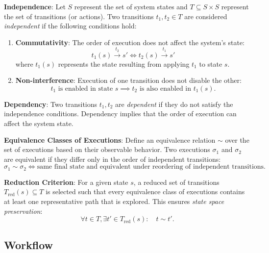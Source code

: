 \textbf{Independence}: Let \( S \) represent the set of system states and \( T \subseteq S \times S \) represent the set of transitions (or actions). Two transitions \( t_1, t_2 \in T \) are considered \textit{independent} if the following conditions hold:
\begin{enumerate}
    \item \textbf{Commutativity}: The order of execution does not affect the system's state:
    \[
    t_1(s) \xrightarrow{t_2} s' \iff t_2(s) \xrightarrow{t_1} s'
    \]
    where \( t_1(s) \) represents the state resulting from applying \( t_1 \) to state \( s \).
    \item \textbf{Non-interference}: Execution of one transition does not disable the other:
    \[
    t_1 \text{ is enabled in state } s \implies t_2 \text{ is also enabled in } t_1(s).
    \]
\end{enumerate}

\textbf{Dependency}: Two transitions \( t_1, t_2 \) are \textit{dependent} if they do not satisfy the independence conditions. Dependency implies that the order of execution can affect the system state. 

\textbf{Equivalence Classes of Executions}: Define an equivalence relation \( \sim \) over the set of executions based on their observable behavior. Two executions \( \sigma_1 \) and \( \sigma_2 \) are equivalent if they differ only in the order of independent transitions:
\[
\sigma_1 \sim \sigma_2 \iff \text{same final state and equivalent under reordering of independent transitions.}
\]

\textbf{Reduction Criterion}: For a given state \( s \), a reduced set of transitions \( T_{\text{red}}(s) \subseteq T \) is selected such that every equivalence class of executions contains at least one representative path that is explored. This ensures \textit{state space preservation}:
\[
\forall t \in T, \exists t' \in T_{\text{red}}(s): \quad t \sim t'.
\]
\subsection{Workflow}

